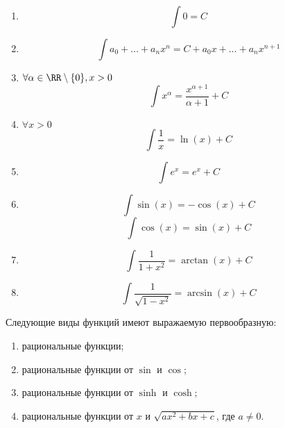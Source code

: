 \documentclass[12pt,a4paper]{article}
\begin{document}
    \begin{lemma}\ 
        \begin{multicols}{2}
            \begin{enumerate}
                \item \[\int 0 = C\]
                \item \[\int a_0 + \dots + a_n x^n = C + a_0 x + \dots + a_n x^{n+1} \]
                \item $\forall \alpha \in \RR \setminus \{0\}, x > 0$
                    \[\int x^\alpha = \frac{x^{\alpha + 1}}{\alpha + 1} + C\]
                \item $\forall x > 0$
                    \[\int \frac{1}{x} = \ln(x) + C\]
                \item \[\int e^x = e^x + C\]
                \item \[\int \sin(x) = -\cos(x) + C\] \[\int \cos(x) = \sin(x) + C\]
                \item \[\int \frac{1}{1+x^2} = \arctan(x) + C\]
                \item \[\int \frac{1}{\sqrt{1-x^2}} = \arcsin(x) + C\]
            \end{enumerate}
        \end{multicols}
    \end{lemma}

    \begin{theorem}
        Следующие виды функций имеют выражаемую первообразную:
        \begin{multicols}{2}
            \begin{enumerate}
                \item рациональные функции;
                \item рациональные функции от $\sin$ и $\cos$;
                \item рациональные функции от $\sinh$ и $\cosh$;
                \item рациональные функции от $x$ и $\sqrt{ax^2 + bx + c}$, где $a \neq 0$.
            \end{enumerate}
        \end{multicols}
    \end{theorem}
\end{document}
